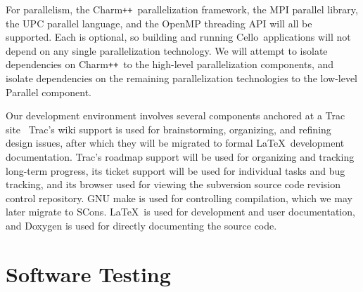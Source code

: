\documentclass[11pt,letterpaper]{article}
\newcommand{\cello}{\textsf{Cello}}
\newcommand{\pp}{\texttt{++}}
\newcommand{\charm}{\textsf{Charm\pp}}
\newcommand{\code}[1]{\textsf{#1}}
\begin{document}
For parallelism, the \charm\ parallelization framework, the MPI
parallel library, the UPC parallel language, and the OpenMP threading
API will all be supported.  Each is optional, so building and running
\cello\ applications will not depend on any single parallelization
technology.  We will attempt to isolate dependencies on \charm\ to the
high-level parallelization components, and isolate dependencies on the
remaining parallelization technologies to the low-level
\code{Parallel} component.

Our development environment involves several components anchored at a
Trac site~\cite{wwwtrac}
Trac's wiki support is used for brainstorming, organizing, and
refining design issues, after which they will be migrated to formal
\LaTeX\ development documentation.  Trac's roadmap support will be
used for organizing and tracking long-term progress, its ticket
support will be used for individual tasks and bug tracking, and its
browser used for viewing the subversion source code revision control
repository.  GNU \code{make} is used for controlling compilation,
which we may later migrate to \code{SCons}.  \LaTeX\ is used for
development and user documentation, and Doxygen is used for directly
documenting the source code.


\section{Software Testing} \label{s:testing}


\end{document}

